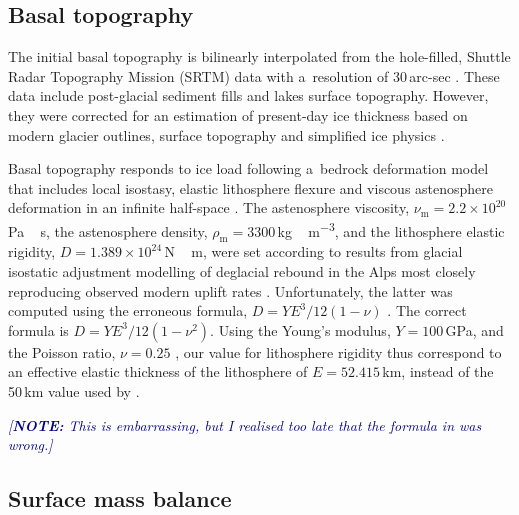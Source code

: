 \documentclass[tc, manuscript]{copernicus}
\newcommand{\note}[1]{\textcolor{darkblue}{\emph{[\textbf{NOTE:} #1]}}}
\begin{document}
\subsection{Basal topography}
\label{sec:bedrock}

    The initial basal topography is bilinearly interpolated from the
    hole-filled, Shuttle Radar Topography Mission (SRTM) data with a~resolution
    of 30\,arc-sec \citep{Jarvis.etal.2008}. These data include post-glacial
    sediment fills and lakes surface topography. However, they were corrected
    for an estimation of present-day ice thickness based on modern
    glacier outlines, surface topography and simplified ice physics
    \citep{Huss.Farinotti.2012}.

    Basal topography responds to ice load following a~bedrock deformation model
    that includes local isostasy, elastic lithosphere flexure and viscous
    astenosphere deformation in an infinite half-space
    \citep{Lingle.Clark.1985,Bueler.etal.2007}. The astenosphere viscosity,
    $\nu_{\mathrm{m}}=2.2\times10^{20}$\,\unit{Pa\,s}, the astenosphere
    density, $\rho_{\mathrm{m}}=3300$\,\unit{kg\,m^{-3}}, and the lithosphere
    elastic rigidity, $D=1.389 \times 10^{24}$\,\unit{N\,m}, were set according to
    results from glacial isostatic adjustment modelling of deglacial rebound in
    the Alps most closely reproducing observed modern uplift rates
    \citep[Supplementary Fig.~7]{Mey.etal.2016}. Unfortunately, the latter was
    computed using the erroneous formula, ${D=YE^3/12(1-\nu)}$
    \citep{Mey.etal.2016}. The correct formula is ${D=YE^3/12(1-\nu^2)}$.
    Using the Young's modulus, $Y=100$\,GPa, and the Poisson ratio, $\nu=0.25$
    \citep{Mey.etal.2016}, our value for lithosphere rigidity thus correspond
    to an effective elastic thickness of the lithosphere of $E=52.415$\,km,
    instead of the 50\,km value used by \citet{Mey.etal.2016}.

    \note{This is embarrassing, but I realised too late that the formula in
          \citet{Mey.etal.2016} was wrong.}


\subsection{Surface mass balance}
\label{sec:surface}
\end{document}
